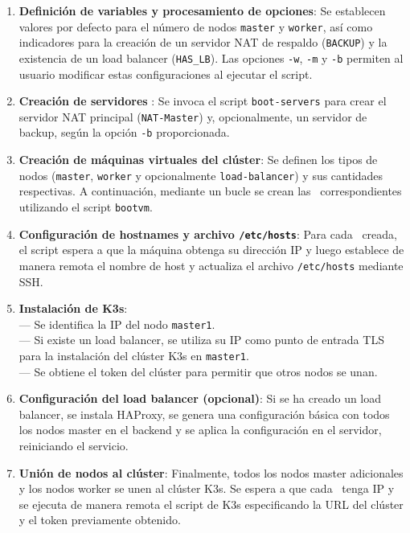 \begin{enumerate}
    \item \textbf{Definición de variables y procesamiento de opciones}:  
    Se establecen valores por defecto para el número de nodos \texttt{master} y \texttt{worker}, así como indicadores para la creación de un servidor NAT de respaldo (\texttt{BACKUP}) y la existencia de un load balancer (\texttt{HAS\_LB}). Las opciones \texttt{-w}, \texttt{-m} y \texttt{-b} permiten al usuario modificar estas configuraciones al ejecutar el script.

    \item \textbf{Creación de servidores \NAT}:  
    Se invoca el script \texttt{boot-servers} para crear el servidor NAT principal (\texttt{NAT-Master}) y, opcionalmente, un servidor de backup, según la opción \texttt{-b} proporcionada.

    \item \textbf{Creación de máquinas virtuales del clúster}:  
    Se definen los tipos de nodos (\texttt{master}, \texttt{worker} y opcionalmente \texttt{load-balancer}) y sus cantidades respectivas. A continuación, mediante un bucle se crean las \VM\ correspondientes utilizando el script \texttt{bootvm}.

    \item \textbf{Configuración de hostnames y archivo \texttt{/etc/hosts}}:  
    Para cada \VM\ creada, el script espera a que la máquina obtenga su dirección IP y luego establece de manera remota el nombre de host y actualiza el archivo \texttt{/etc/hosts} mediante SSH.

    \item \textbf{Instalación de K3s}:  \\
    --- Se identifica la IP del nodo \texttt{master1}.  \\
    --- Si existe un load balancer, se utiliza su IP como punto de entrada TLS para la instalación del clúster K3s en \texttt{master1}.  \\
    --- Se obtiene el token del clúster para permitir que otros nodos se unan.

    \item \textbf{Configuración del load balancer (opcional)}:  
    Si se ha creado un load balancer, se instala HAProxy, se genera una configuración básica con todos los nodos master en el backend y se aplica la configuración en el servidor, reiniciando el servicio.

    \item \textbf{Unión de nodos al clúster}:  
    Finalmente, todos los nodos master adicionales y los nodos worker se unen al clúster K3s. Se espera a que cada \VM\ tenga IP y se ejecuta de manera remota el script de K3s especificando la URL del clúster y el token previamente obtenido.

\end{enumerate}


